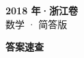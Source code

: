 \documentclass[zihao=-4, a4paper]{ctexart}
\begin{document}
\begin{center}
  {\Large\bfseries 2018 年·浙江卷}\\[4pt]
  {\large 数学 · 简答版}
\end{center}
\medskip
{}

\clearpage
{}
\begin{center}{\Large\bfseries 答案速查}\end{center}
\medskip

\end{document}

